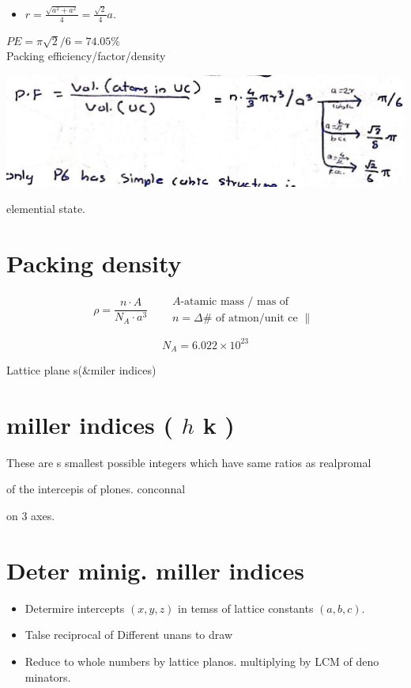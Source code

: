 \documentclass[10pt]{article}
\begin{document}
\begin{itemize}
  \item $r=\frac{\sqrt{a^{2}+a^{2}}}{4}=\frac{\sqrt{2}}{4} a$.
\end{itemize}

$P E=\pi \sqrt{2} / 6=74.05 \%$\\
Packing efficiency/factor/density

\begin{center}
\includegraphics[max width=\textwidth]{2024_06_16_30d750483617f1939202g-07(4)}
\end{center}

elemential state.

\section*{Packing density}
$$
\rho=\frac{n \cdot A}{N_{A} \cdot a^{3}} \quad \begin{aligned}
& A \text {-atamic mass } / \text { mas of } \\
& n=\Delta \# \text { of atmon/unit ce } \|
\end{aligned}
$$

$$
N_{A}=6.022 \times 10^{23}
$$

Lattice plane s(\&miler indices)

\section*{miller indices ( $h$ k )}
These are s smallest possible integers which have same ratios as realpromal

of the intercepis of plones. conconnal

on 3 axes.

\section*{Deter minig. miller indices}
\begin{itemize}
  \item Determire intercepts $(x, y, z)$ in temss of lattice constants $(a, b, c)$.
  \item Talse reciprocal of Different unans to draw
  \item Reduce to whole numbers by lattice planos. multiplying by LCM of deno minators.
\end{itemize}
\end{document}
